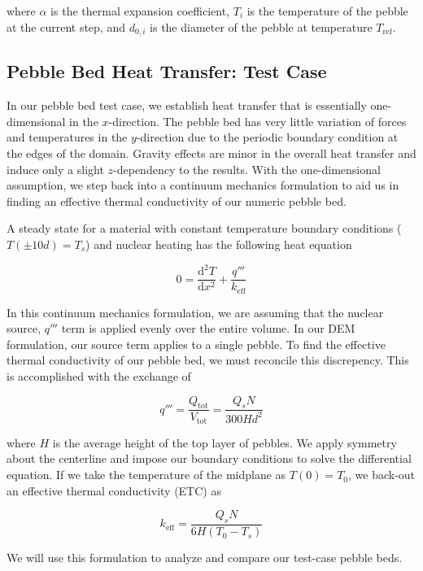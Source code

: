 where $\alpha$ is the thermal expansion coefficient, $T_i$ is the temperature of the pebble at the current step, and $d_{0,i}$ is the diameter of the pebble at temperature $T_\text{ref}$.






\subsection{Pebble Bed Heat Transfer: Test Case}
In our pebble bed test case, we establish heat transfer that is essentially one-dimensional in the $x$-direction. The pebble bed has very little variation of forces and temperatures in the $y$-direction due to the periodic boundary condition at the edges of the domain. Gravity effects are minor in the overall heat transfer and induce only a slight $z$-dependency  to the results. With the one-dimensional assumption, we step back into a continuum mechanics formulation to aid us in finding an effective thermal conductivity of our numeric pebble bed. 

A steady state for a material with constant temperature boundary conditions ($T(\pm 10d) = T_s$) and nuclear heating has the following heat equation

\begin{equation}\label{eq:continuum-heateqn}
	0 = \frac{\mathrm{d}^2T}{\mathrm{d}x^2} + \frac{q'''}{k_\text{eff}}
\end{equation}

In this continuum mechanics formulation, we are assuming that the nuclear source, $q'''$ term is applied evenly over the entire volume. In our DEM formulation, our source term applies to a single pebble. To find the effective thermal conductivity of our pebble bed, we must reconcile this discrepency. This is accomplished  with the exchange of

\begin{equation}
	q''' = \frac{Q_\text{tot}}{V_\text{tot}} = \frac{Q_sN}{300Hd^2}
\end{equation}

where $H$ is the average height of the top layer of pebbles. We apply symmetry about the centerline and impose our boundary conditions to solve the differential equation. If we take the temperature of the midplane as $T(0) = T_0$, we back-out an effective thermal conductivity (ETC) as

\begin{equation}\label{eq:etc}
	k_\text{eff} = \frac{Q_sN}{6H(T_0-T_s)}
\end{equation}


We will use this formulation to analyze and compare our test-case pebble beds.



